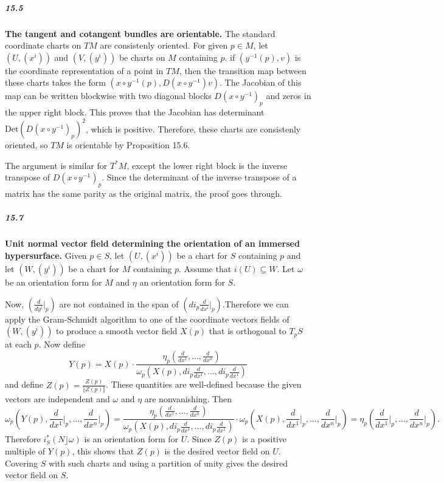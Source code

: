 \documentclass[10pt,letter]{article}
\begin{document}
\subparagraph*{15.5} {\bf The tangent and cotangent bundles are orientable.} The standard coordinate charts on $TM$ are consistenly oriented. For given $p \in M$, let $(U,(x^i))$ and $(V,(y^i))$ be charts on $M$ containing $p$. if $(y^{-1}(p),v)$ is the coordinate representation of a point in $TM$, then the transition map between these charts takes the form $(x \circ y^{-1}(p),D(x \circ y^{-1})v)$. The Jacobian of this map can be written blockwise with two diagonal blocks $D(x \circ y^{-1})_p$ and zeros in the upper right block. This proves that the Jacobian has determinant $\text{Det}(D(x \circ y^{-1})_p)^2$, which is positive. Therefore, these charts are consistenly oriented, so $TM$ is orientable by Proposition 15.6. 

The argument is similar for $T^{\ast}M$, except the lower right block is the inverse transpose of $D(x \circ y^{-1})_p$. Since the determinant of the inverse transpose of a matrix has the same parity as the original matrix, the proof goes through. 


\subparagraph*{15.7} {\bf Unit normal vector field determining the orientation of an immersed hypersurface.} Given $p \in S$, let $(U,(x^i))$ be a chart for $S$ containing $p$ and let $(W,(y^i))$ be a chart for $M$ containing $p$. Assume that $i(U) \subseteq W$. Let $\omega$ be an orientation form for $M$ and $\eta$ an orientation form for $S$. 

Now, $(\frac{d}{dy^i}\vert_p)$ are not contained in the span of $(di_p\frac{d}{dx^i}\vert_p)$.Therefore we can apply the Gram-Schmidt algorithm to one of the coordinate vectors fields of $(W,(y^i))$ to produce a smooth vector field $X(p)$ that is orthogonal to $T_pS$ at each $p$. Now define \[ Y(p) = X(p) \cdot \frac{\eta_p(\frac{d}{dx^1},...,\frac{d}{dx^n})}{\omega_p(X(p),di_p\frac{d}{dx^1},...,di_p\frac{d}{dx^1})} \] and define $Z(p) = \frac{Z(p)}{\Vert Z(p) \Vert}$.  These quantities are well-defined because the given vectors are independent and $\omega$ and $\eta$ are nonvanishing. Then 
\begin{dmath*}
 \omega_p(Y(p),\frac{d}{dx^1}\vert_p,...,\frac{d}{dx^n}\vert_p) =  \frac{\eta_p(\frac{d}{dx^1},...,\frac{d}{dx^n})}{\omega_p(X(p),di_p\frac{d}{dx^1},...,di_p\frac{d}{dx^1})} \cdot \omega_p(X(p),\frac{d}{dx^1}\vert_p,...,\frac{d}{dx^n}\vert_p) = \eta_p(\frac{d}{dx^1}\vert_p,...,\frac{d}{dx^n}\vert_p). 
\end{dmath*}
Therefore $i^{\ast}_S(N \rfloor \omega)$ is an orientation form for $U$. Since $Z(p)$ is a positive multiple of $Y(p)$, this shows that $Z(p)$ is the desired vector field on $U$. Covering $S$ with such charts and using a partition of unity gives the desired vector field on $S$. 
\end{document}
